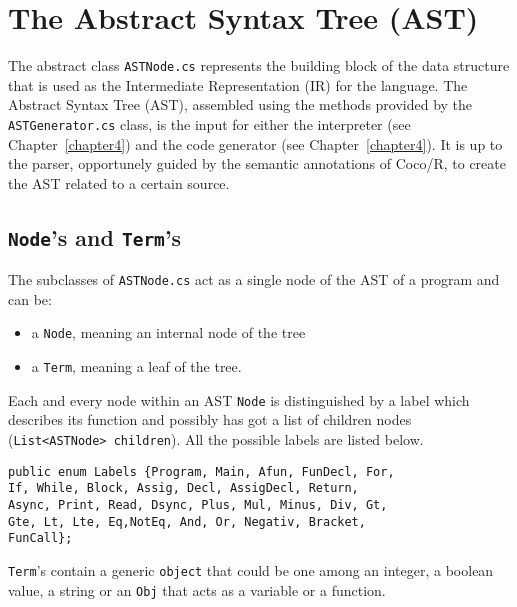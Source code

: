 \chapter{\label{chapter3} The Abstract Syntax Tree (AST)}

The abstract class \texttt{ASTNode.cs} represents the building block of the data structure that is used as the Intermediate Representation (IR) for the \fwap language. The Abstract Syntax Tree (AST), assembled using the methods provided by the \texttt{ASTGenerator.cs} class, is the input for either the interpreter (see Chapter~\ref{chapter4}) and the \fsharp code generator (see Chapter~\ref{chapter4}). It is up to the parser, opportunely guided by the semantic annotations of Coco/R, to create the AST related to a certain \fwap source.

\section{\texttt{Node}'s and \texttt{Term}'s}

The subclasses of \texttt{ASTNode.cs} act as a single node of the AST of a program and can be:
\begin{itemize}
	\item a \texttt{Node}, meaning an internal node of the tree 
	\item a \texttt{Term}, meaning a leaf of the tree.
\end{itemize}

Each and every node within an AST \texttt{Node} is distinguished by a label which describes its function and possibly has got a list of children nodes (\texttt{List<ASTNode> children}). All the possible labels are listed below.\\

\begin{lstlisting}[caption=Labels for \texttt{Node}s.]
public enum Labels {Program, Main, Afun, FunDecl, For,
If, While, Block, Assig, Decl, AssigDecl, Return, 
Async, Print, Read, Dsync, Plus, Mul, Minus, Div, Gt,
Gte, Lt, Lte, Eq,NotEq, And, Or, Negativ, Bracket, 
FunCall};
\end{lstlisting}

\texttt{Term}'s contain a generic \texttt{object} that could be one among an integer, a boolean value, a string or an \texttt{Obj} that acts as a variable or a function.